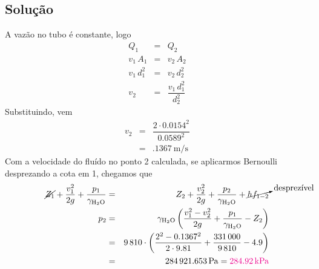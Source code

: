 \documentclass[a4paper, 12pt, brazilian]{article}
\begin{document}
	\subsection{Solução}
	A vazão no tubo é constante, logo
	\begin{eqnarray}
		Q_{1}&=&Q_{2}\\
		v_{1}\,A_{1}&=&v_{2}\,A_{2}\\
		v_{1}\,d_{1}^{2}&=&v_{2}\,d_{2}^{2}\\
		v_{2}&=&\dfrac{v_{1}\,d_{1}^{2}}{d_{2}^{2}}
	\end{eqnarray}
	Substituindo, vem
	\begin{eqnarray}
		v_{2}&=&\dfrac{2\cdot 0.0154^{2}}{0.0589^{2}}\\
			 &=&\SI{.1367}{\meter/\second}
	\end{eqnarray}
	Com a velocidade do fluído no ponto 2 calculada, se aplicarmos Bernoulli des\-prezando a cota em 1, chegamos que
	\begin{eqnarray}
		\cancel{Z_{1}}+\dfrac{v_{1}^{2}}{2g}+\dfrac{p_{1}}{\gamma_{\ce{H2O}}}&=&Z_{2}+\dfrac{v_{2}^{2}}{2g}+\dfrac{p_{2}}{\gamma_{\ce{H2O}}}+\cancelto{\textrm{desprezível}}{hf_{1-2}}\\
		p_{2}&=&\gamma_{\ce{H2O}}\left(\dfrac{v_{1}^{2}-v_{2}^{2}}{2g}+\dfrac{p_{1}}{\gamma_{\ce{H2O}}}-Z_{2}\right)\\
			 &=&9\,810\cdot\left(\dfrac{2^{2}-0.1367^{2}}{2\cdot 9.81}+\dfrac{331\,000}{9\,810}-4.9\right)\\
			 &=&\SI{284921.653}{\pascal}=\purple{\SI{284.92}{\kilo\pascal}}
	\end{eqnarray}
\end{document}
